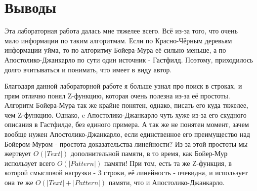 \section{Выводы}

Эта лабораторная работа далась мне тяжелее всего. Всё из-за того, что очень мало информации по таким алгоритмам. Если по Красно-Чёрным деревьям информации уйма, то по алгоритму Бойера-Мура её сильно меньше, а по Апостолико-Джанкарло по сути один источник - Гастфилд. Поэтому, приходилось долго вчитываться и понимать, что имеет в виду автор.

Благодаря данной лабораторной работе я больше узнал про поиск в строках, и прям отлично понял Z-функцию, которая очень полезна из-за её простоты. Алгоритм Бойера-Мура так же крайне понятен, однако, писать его куда тяжелее, чем Z-функцию. Однако, c Апостолико-Джанкарло чуть хуже из-за его скудного описания в Гастфилде, без единого примера. А так же не понятен момент, зачем вообще нужен Апостолико-Джанкарло, если единственное его преимущество над Бойером-Муром - простота доказательства линейности? Из-за этой простоты мы жертвует $O(|Text|)$ дополнительной памяти, в то время, как Бойер-Мур использует всего $O(|Pattern|)$ памяти! При том, есть та же Z-функция, в которой смысловой нагрузки - 3 строки, её линейность - очевидна, и использует она те же $O(|Text| + |Pattern|)$ памяти, что и Апостолико-Джанкарло.

\pagebreak
